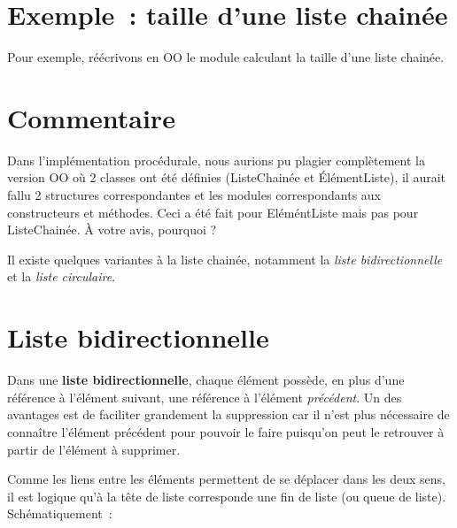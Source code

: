 \section{Exemple~: taille d'une liste chainée}

	Pour exemple, réécrivons en OO le module calculant la taille d'une liste chainée.



\section{Commentaire}

	Dans l'implémentation procédurale, nous aurions pu plagier complètement 
	la version OO où 2 classes ont été définies (ListeChainée et ÉlémentListe), 
	il aurait fallu 2 structures correspondantes et les modules correspondants 
	aux constructeurs et méthodes. Ceci a été fait pour EléméntListe mais pas 
	pour ListeChainée. À votre avis, pourquoi ?

	Il existe quelques variantes à la liste chainée, notamment la 
	\textit{liste bidirectionnelle} et la \textit{liste circulaire}.


\section{Liste bidirectionnelle}

	Dans une \textbf{liste bidirectionnelle}, chaque élément possède, 
	en plus d'une référence à l'élément suivant,
	une référence à l'élément \textit{précédent}. Un des avantages est 
	de faciliter grandement la suppression car il n'est
	plus nécessaire de connaître l'élément précédent pour pouvoir le faire 
	puisqu'on peut le retrouver à partir de
	l'élément à supprimer.

	Comme les liens entre les éléments permettent de se déplacer 
	dans les deux sens, il est logique qu'à la tête de liste
	corresponde une fin de liste (ou queue de liste). Schématiquement~:

